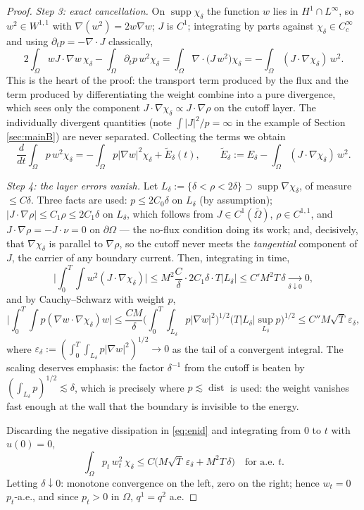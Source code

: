 \documentclass[11pt]{amsart}
\theoremstyle{definition}
\newcommand{\dive}{\nabla\!\cdot}
\begin{document}
\begin{proof}
\emph{Step 3: exact cancellation.} On
$\operatorname{supp}\chi_\delta$ the function $w$ lies in
$H^1\cap L^\infty$, so $w^2\in W^{1,1}$ with
$\nabla(w^2)=2w\nabla w$; $J$ is $C^1$; integrating by parts against
$\chi_\delta\in C_c^\infty$ and using $\partial_tp=-\dive J$
classically,
\[
2\int_\Omega wJ\cdot\nabla w\,\chi_\delta
-\int_\Omega\partial_tp\,w^2\chi_\delta
=\int_\Omega\dive\!\big(J\,w^2\big)\chi_\delta
=-\int_\Omega(J\cdot\nabla\chi_\delta)\,w^2 .
\]
This is the heart of the proof: the transport term produced by the
flux and the term produced by differentiating the weight combine
into a pure divergence, which sees only the component
$J\cdot\nabla\chi_\delta\propto J\cdot\nabla\rho$ on the cutoff
layer. The individually divergent quantities (note
$\int|J|^2/p=\infty$ in the example of Section \ref{sec:mainB}) are
never separated. Collecting the terms we obtain
\begin{equation}\label{eq:enid}
\frac{d}{dt}\int_\Omega p\,w^2\chi_\delta
=-\int_\Omega p|\nabla w|^2\chi_\delta+\widetilde E_\delta(t),
\qquad
\widetilde E_\delta:=E_\delta-\int_\Omega
(J\cdot\nabla\chi_\delta)\,w^2 .
\end{equation}

\emph{Step 4: the layer errors vanish.} Let
$L_\delta:=\{\delta<\rho<2\delta\}\supset
\operatorname{supp}\nabla\chi_\delta$, of measure $\le C\delta$.
Three facts are used: $p\le2C_0\delta$ on $L_\delta$ (by assumption);
$|J\cdot\nabla\rho|\le C_1\rho\le2C_1\delta$ on $L_\delta$, which
follows from $J\in C^1(\bar\Omega)$, $\rho\in C^{1,1}$, and
$J\cdot\nabla\rho=-J\cdot\nu=0$ on $\partial\Omega$ --- the no-flux
condition doing its work; and, decisively, that
$\nabla\chi_\delta$ is parallel to $\nabla\rho$, so the cutoff never
meets the \emph{tangential} component of $J$, the carrier of any
boundary current. Then, integrating in time,
\[
\Big|\int_0^T\!\!\int w^2(J\cdot\nabla\chi_\delta)\Big|
\le M^2\frac{C}{\delta}\cdot2C_1\delta\cdot T|L_\delta|
\le C'M^2T\,\delta\xrightarrow[\delta\downarrow0]{}0,
\]
and by Cauchy--Schwarz with weight $p$,
\[
\Big|\int_0^T\!\!\int p(\nabla w\cdot\nabla\chi_\delta)w\Big|
\le\frac{CM}{\delta}
\Big(\int_0^T\!\!\int_{L_\delta}p|\nabla w|^2\Big)^{1/2}
\Big(T|L_\delta|\sup_{L_\delta}p\Big)^{1/2}
\le C''M\sqrt{T}\,\varepsilon_\delta,
\]
where $\varepsilon_\delta:=(\int_0^T\!\int_{L_\delta}p|\nabla
w|^2)^{1/2}\to0$ as the tail of a convergent integral. The scaling
deserves emphasis: the factor $\delta^{-1}$ from the cutoff is
beaten by $(\int_{L_\delta}p)^{1/2}\lesssim\delta$, which is
precisely where $p\lesssim\operatorname{dist}$ is used: the
weight vanishes fast enough at the wall that the boundary is
invisible to the energy.

Discarding the negative dissipation in
\eqref{eq:enid} and integrating from $0$ to $t$ with $u(0)=0$,
\[
\int_\Omega p_t\,w_t^2\,\chi_\delta\le
C\big(M\sqrt{T}\,\varepsilon_\delta+M^2T\,\delta\big)
\quad\text{for a.e.\ }t .
\]
Letting $\delta\downarrow0$: monotone convergence on the left, zero
on the right; hence $w_t=0$ $p_t$-a.e., and since $p_t>0$ in
$\Omega$, $q^1=q^2$ a.e.
\end{proof}
\end{document}
